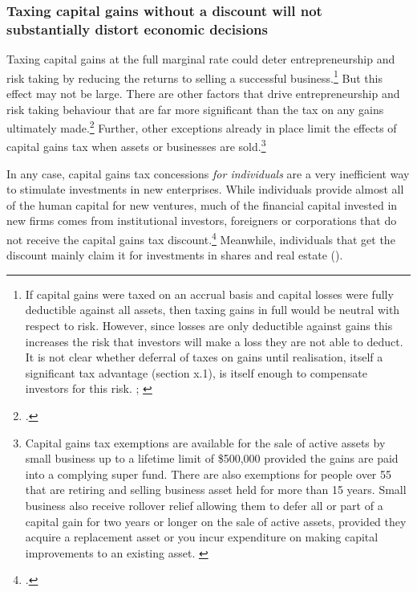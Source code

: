 \documentclass{grattan}\usepackage[]{graphicx}\usepackage[]{color}
\begin{document}
\subsubsection{Taxing capital gains without a discount will not substantially distort economic decisions}
Taxing capital gains at the full marginal rate could deter entrepreneurship and risk taking by reducing the returns to selling a successful business.\footnote{If capital gains were taxed on an accrual basis and capital losses were fully deductible against all assets, then taxing gains in full would be neutral with respect to risk. However, since losses are only deductible against gains this increases the risk that investors will make a loss they are not able to deduct. It is not clear whether deferral of taxes on gains until realisation, itself a significant tax advantage (section x.1), is itself enough to compensate investors for this risk. \textcite[p.~8]{Burman2009};  \textcite[p.~130]{Commission2004}}  But this effect may not be large. There are other factors that drive entrepreneurship and risk taking behaviour that are far more significant than the tax on any gains ultimately made.\footcite[p.~75]{Burman1999}   Further, other exceptions already in place limit the effects of capital gains tax when assets or businesses are sold.\footnote{Capital gains tax exemptions are available for the sale of active assets by small business up to a lifetime limit of \$500,000 provided the gains are paid into a complying super fund. There are also exemptions for people over 55 that are retiring and selling business asset held for more than 15 years. Small business also receive rollover relief allowing them to defer all or part of a capital gain for two years or longer on the sale of active assets, provided they acquire a replacement asset or you incur expenditure on making capital improvements to an existing asset. \textcite{ATO2014e}}

In any case, capital gains tax concessions \emph{for individuals} are a very inefficient way to stimulate investments in new enterprises. While individuals provide almost all of the human capital for new ventures, much of the financial capital invested in new firms comes from institutional investors, foreigners or corporations that do not receive the capital gains tax discount.\footcite{Burman1999}  Meanwhile, individuals that get the discount mainly claim it for investments in shares and real estate (). 
\end{document}
